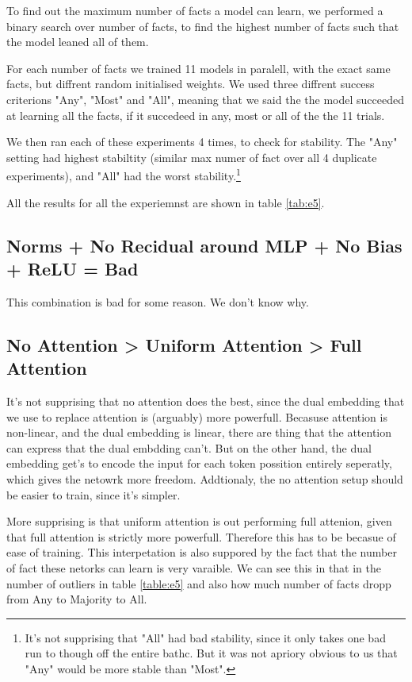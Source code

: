 \documentclass[11pt,a4paper]{article}
\begin{document}
To find out the maximum number of facts a model can learn, we performed a binary search over number of facts, to find the highest number of facts such that the model leaned all of them.

For each number of facts we trained 11 models in paralell, with the exact same facts, but diffrent random initialised weights. We used three diffrent success criterions "Any", "Most" and "All", meaning that we said the the model succeeded at learning all the facts, if it succedeed in any, most or all of the the 11 trials. 

We then ran each of these experiments 4 times, to check for stability. The "Any" setting had highest stabiltity (similar max numer of fact over all 4 duplicate experiments), and "All" had the worst stability.\footnote{It's not supprising that "All" had bad stability, since it only takes one bad run to though off the entire bathc. But it was not apriory obvious to us that "Any" would be more stable than "Most".}

All the results for all the experiemnst are shown in table \ref{tab:e5}.

\subsection{Norms + No Recidual around MLP + No Bias + ReLU = Bad}
This combination is bad for some reason. We don't know why. 

\subsection{No Attention > Uniform Attention > Full Attention}
It's not supprising that no attention does the best, since the dual embedding that we use to replace attention is (arguably) more powerfull. Becasuse attention is non-linear, and the dual embedding is linear, there are thing that the attention can express that the dual embdding can't. But on the other hand, the dual embedding get's to encode the input for each token possition entirely seperatly, which gives the netowrk more freedom. Addtionaly, the no attention setup should be easier to train, since it's simpler.

More supprising is that uniform attention is out performing full attenion, given that full attention is strictly more powerfull. Therefore this has to be becasue of ease of training. This interpetation is also suppored by the fact that the number of fact these netorks can learn is very varaible. We can see this in that in the number of outliers in table \ref{table:e5} and also how much number of facts dropp from Any to Majority to All.
\end{document}
